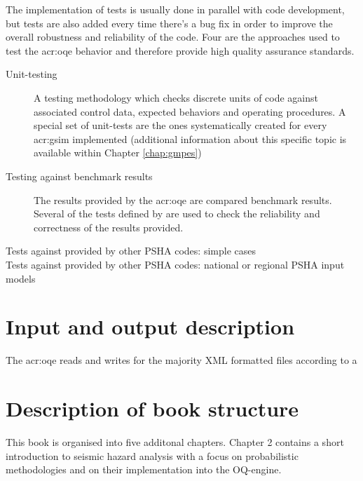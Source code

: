 The implementation of tests is usually done in parallel with code 
development, but tests are also added every time there's a bug fix 
in order to improve the overall robustness and reliability of the code.
%
Four are the approaches used to test the \gls{acr:oqe} behavior 
and therefore provide high quality assurance standards. 
%
\begin{description}
    \item [Unit-testing] A testing methodology which checks discrete 
        units of code against associated control data, expected behaviors 
        and operating procedures. A special set of unit-tests are the ones
        systematically created for every \gls{acr:gsim} implemented 
        (additional information about this specific topic is available within 
        Chapter \ref{chap:gmpes})
    \item [Testing against benchmark results] The results provided by the 
        \gls{acr:oqe} are compared benchmark results. Several of the 
        tests defined by \textcite{thomas2010} are used to check the 
        reliability and correctness of the results provided. 
    \item [Tests against provided by other PSHA codes: simple cases]
    \item [Tests against provided by other PSHA codes: national or regional 
        PSHA input models]
\end{description}
%
\section{Input and output description}
The \gls{acr:oqe} reads and writes for the majority XML formatted files
according to a

%
\section{Description of book structure}
This book is organised into five additonal chapters. Chapter 2 contains a 
short introduction to seismic hazard analysis with a focus on probabilistic 
methodologies and on their implementation into the OQ-engine.
